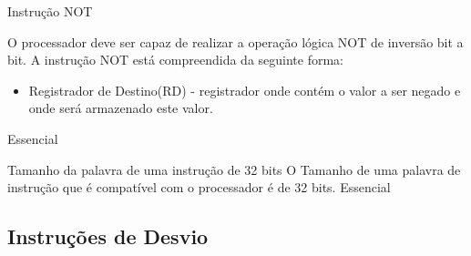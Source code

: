 \documentclass{article}
\begin{document}
\begin{functional}
      \requirement
      {Instrução NOT}
      {O processador deve ser capaz de realizar a operação lógica NOT de inversão bit a bit.
      A instrução NOT está compreendida da seguinte forma:
       \begin{itemize}
         \item Registrador de Destino(RD) - registrador onde contém o valor a ser negado e onde será armazenado este valor.
         \end{itemize}
         }
      {Essencial}

      \requirement
      {Tamanho da palavra de uma instrução de 32 bits}
      {O Tamanho de uma palavra de instrução que é compatível com o processador é de 32 bits.}
      {Essencial}
\end{functional}
    \subsection{Instruções de Desvio}
\end{document}
